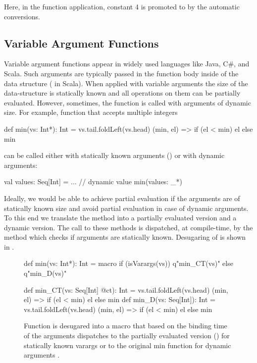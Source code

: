 Here, in the function application, constant 4 is promoted to  by the automatic
conversions. 

\subsection{Variable Argument Functions}
\label{sct:varargs}

Variable argument functions appear in widely used languages like Java, C\#, and Scala.
 Such arguments are typically passed in the function body inside of the data structure
 (\eg {} in Scala). When applied with variable arguments the size of the
 data-structure is statically known and all operations on them can be partially
 evaluated. However, sometimes, the function is called with arguments of dynamic size.
 For example, function  that accepts multiple integers\begin{lstparagraph}
def min(vs: Int*): Int =
  vs.tail.foldLeft(vs.head){ (min, el) => if (el < min) el else min }
\end{lstparagraph}can be called either with statically known arguments
 (\eg {}) or with dynamic arguments:\begin{lstparagraph}
val values: Seq[Int] = ... // dynamic value
min(values: _*)
\end{lstparagraph}

Ideally, we would be able to achieve partial evaluation if the arguments are of statically
known size and avoid partial evaluation in case of dynamic arguments. To this end we translate
the method  into a partially evaluated version and a dynamic version. The call to these
methods is dispatched, at compile-time, by the  method which checks if
arguments are statically known. Desugaring of  is shown in .

\begin{figure}
\begin{listing}
def min(vs: Int*): Int = macro
  if (isVarargs(vs)) q"min_CT(vs)"
  else q"min_D(vs)"

def min_CT(vs: Seq[Int] @ct): Int =
  vs.tail.foldLeft(vs.head){ (min, el) => if (el < min) el else min }
def min_D(vs: Seq[Int]): Int =
  vs.tail.foldLeft(vs.head){ (min, el) => if (el < min) el else min }
\end{listing}
\caption{Function  is desugared into a  macro that based on the
binding time of the arguments dispatches to the partially evaluated version ()
for statically known varargs or to the original min function for dynamic arguments .}
\label{fig:min}
\end{figure}

